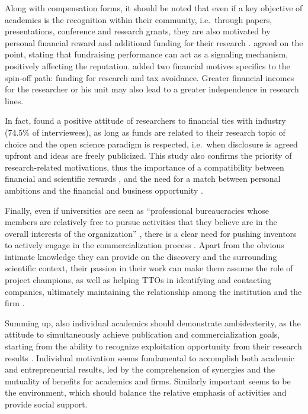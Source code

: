 Along with compensation forms, it should be noted that even if a key objective of academics is the recognition within their community, i.e.\ through papers, presentations, conference and research grants, they are also motivated by personal financial reward and additional funding for their research \citep{Siegel2003a, Link2007, Fini2009}. \citet{DEste2007, DEste2011} agreed on the point, stating that fundraising performance can act as a signaling mechanism, positively affecting the reputation. \citet{Rizzo2015} added two financial motives specifics to the spin-off path: funding for research and tax avoidance. Greater financial incomes for the researcher or his unit may also lead to a greater independence in research lines.

In fact, \citet{DEste2011} found a positive attitude of researchers to financial ties with industry (74.5\% of interviewees), as long as funds are related to their research topic of choice and the open science paradigm is respected, i.e.\ when disclosure is agreed upfront and ideas are freely publicized. This study also confirms the priority of research-related motivations, thus the importance of a compatibility between financial and scientific rewards \citep{Baldini2007, Link2007}, and the need for a match between personal ambitions and the financial and business opportunity \citep{Tijssen2006}.

Finally, even if universities are seen as \enquote{professional bureaucracies whose members are relatively free to pursue activities that they believe are in the overall interests of the organization} \citep{DEste2011}, there is a clear need for pushing inventors to actively engage in the commercialization process \citep{Jensen1998}. Apart from the obvious intimate knowledge they can provide on the discovery and the surrounding scientific context, their passion in their work can make them assume the role of project champions, as well as helping TTOs in identifying and contacting companies, ultimately maintaining the relationship among the institution and the firm \citep{Markman2005}.

Summing up, also individual academics should demonstrate ambidexterity, as the attitude to simultaneously achieve publication and commercialization goals, starting from the ability to recognize exploitation opportunity from their research results \citep{Chang2016}. Individual motivation seems fundamental to accomplish both academic and entrepreneurial results, led by the comprehension of synergies and the mutuality of benefits for academics and firms. Similarly important seems to be the environment, which should balance the relative emphasis of activities and provide social support. 

